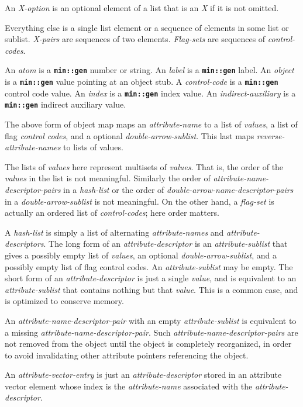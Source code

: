 \documentclass[12pt]{article}
\newcommand{\TT}[1]{{\tt \bfseries #1}}
\begin{document}
An {\em X-option} is an optional element of a list that is an {\em X} if
it is not omitted.

Everything else is a single list element or
a sequence of elements in some list or sublist.
{\em X-pairs} are sequences of two elements.
{\em Flag-sets} are sequences of {\em control-codes}.

An {\em atom} is a \TT{min::gen} number or string.
An {\em label} is a \TT{min::gen} label.
An {\em object} is a \TT{min::gen} value pointing at an object stub.
A {\em control-code} is a \TT{min::gen} control code value.
An {\em index} is a \TT{min::gen} index value.
An {\em indirect-auxiliary} is a \TT{min::gen} indirect auxiliary value.

The above form of object map maps an {\em attribute-name} to a list of
{\em values}, a list of flag {\em control codes}, and a optional
{\em double-arrow-sublist}.  This last maps {\em reverse-attribute-names}
to lists of values.

The lists of {\em values} here represent multisets of {\em values}.
That is, the
order of the {\em values} in the list is not meaningful.
Similarly the order of {\em attribute-name-descriptor-pairs}
in a {\em hash-list}
or the order of {\em double-arrow-name-descriptor-pairs}
in a {\em double-arrow-sublist} is not meaningful.
On the other hand, a {\em flag-set} is actually an ordered list
of {\em control-codes}; here order matters.

A {\em hash-list} is simply a list of alternating {\em attribute-names}
and {\em attribute-descriptors}.
The long form of an {\em attribute-descriptor} is an
{\em attribute-sublist} that gives  a possibly empty list of {\em values},
an optional {\em double-arrow-sublist}, and a possibly empty
list of flag control codes.
An {\em attribute-sublist} may be empty.
The short form of an {\em attribute-descriptor} is just a single
{\em value}, and is equivalent to an {\em attribute-sublist}
that contains nothing but that {\em value}.
This is a common case, and is optimized to conserve memory.

An {\em attribute-name-descriptor-pair} with an
empty {\em attribute-sublist} is equivalent to a missing
{\em attribute-name-descriptor-pair}.
Such {\em attri\-bute-name-descriptor-pairs}
are not
removed from the object until the object is completely reorganized,
in order to avoid invalidating other attribute pointers referencing the object.

An {\em attribute-vector-entry} is just an {\em attribute-descriptor}
stored in an attribute vector element whose index is the
{\em attribute-name} associated with the {\em attribute-descriptor}.
\end{document}
